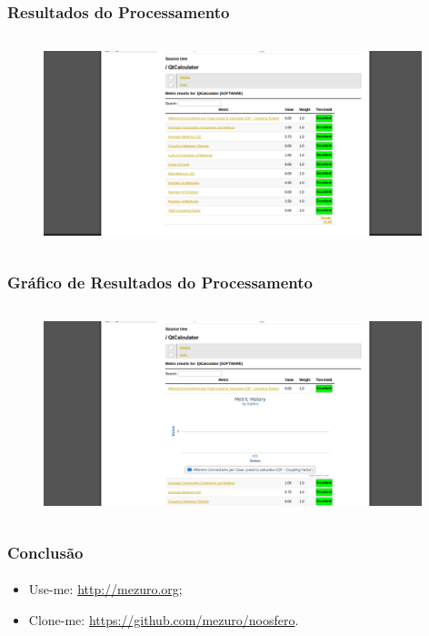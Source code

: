 \documentclass{beamer}
\begin{document}
    \begin{frame}
      \frametitle{Resultados do Processamento}
      \framesubtitle{}
    
      \begin{figure}
        \begin{center}
          \includegraphics[width=11cm, height=6cm]{images/09-processing-results.png}
          \label{fig:processing-results}
        \end{center}
      \end{figure}
    \end{frame}
    
    \begin{frame}
      \frametitle{Gráfico de Resultados do Processamento}
      \framesubtitle{}
    
      \begin{figure}
        \begin{center}
          \includegraphics[width=11cm, height=6cm]{images/10-processing-results-graphic.png}
          \label{fig:processing-results-graphic}
        \end{center}
      \end{figure}
    \end{frame}
  
  \begin{frame}
    \frametitle{Conclusão}
    \framesubtitle{}
    
    \begin{itemize}
      \item Use-me: \url{http://mezuro.org};
      \item Clone-me: \url{https://github.com/mezuro/noosfero}.
    \end{itemize}
  \end{frame}
  
\end{document}
